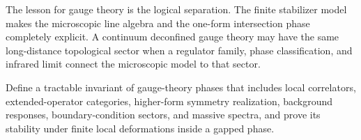 The lesson for gauge theory is the logical separation.  The finite stabilizer
model makes the microscopic line algebra and the one-form intersection phase
completely explicit.  A continuum deconfined gauge theory may have the same
long-distance topological sector when a regulator family, phase
classification, and infrared limit connect the microscopic model to that
sector.

\begin{openproblem}
\label{op:complete-phase-invariant-gauge-theories}
Define a tractable invariant of gauge-theory phases that includes local
correlators, extended-operator categories, higher-form symmetry realization,
background responses, boundary-condition sectors, and massive spectra, and
prove its stability under finite local deformations inside a gapped phase.
\end{openproblem}
